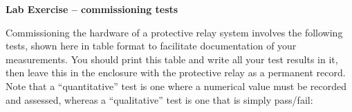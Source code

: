 \noindent
{\bf Lab Exercise -- commissioning tests}

\vskip 5pt

Commissioning the hardware of a protective relay system involves the following tests, shown here in table format to facilitate documentation of your measurements.  You should print this table and write all your test results in it, then leave this in the enclosure with the protective relay as a permanent record.  Note that a ``quantitative'' test is one where a numerical value must be recorded and assessed, whereas a ``qualitative'' test is one that is simply pass/fail:



